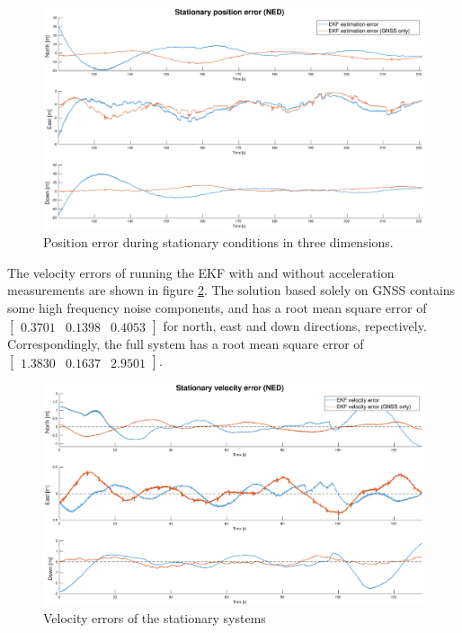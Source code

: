     \begin{figure}
        \hspace{-1.5cm}
        \includegraphics[scale=0.3]{Results/Images/converge.eps}
        \caption{Position error during stationary conditions in three dimensions.}
        \label{fig:converge}
    \end{figure}
    
    The velocity errors of running the EKF with and without acceleration measurements are shown in figure \ref{fig:vel-err-stat}. The solution based solely on GNSS contains some high frequency noise components, and has a root mean square error of $\begin{bmatrix} 0.3701  &  0.1398  &  0.4053\end{bmatrix}$ for north, east and down directions, repectively. Correspondingly, the full system has a root mean square error of $\begin{bmatrix} 1.3830  &  0.1637 &   2.9501\end{bmatrix}$.
    
    \begin{figure}
        \hspace{-1.5cm}
        \includegraphics[scale=0.3]{Results/Images/vel-err.eps}
        \caption{Velocity errors of the stationary systems}
        \label{fig:vel-err-stat}
    \end{figure}
    

